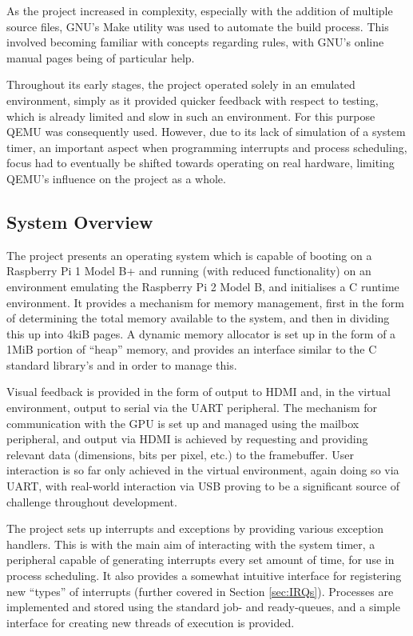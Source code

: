         As the project increased in complexity, especially with the addition of
        multiple source files, GNU's Make utility was used to automate the build
        process. This involved becoming familiar with concepts regarding rules,
        with GNU's online manual pages \cite{MakeManual, MakeVariables} being of
        particular help.

        Throughout its early stages, the project operated solely in an emulated
        environment, simply as it provided quicker feedback with respect to
        testing, which is already limited and slow in such an environment.
        For this purpose QEMU was consequently used. However, due to its lack of
        simulation of a system timer, an important aspect when programming
        interrupts and process scheduling, focus had to eventually be shifted
        towards operating on real hardware, limiting QEMU's influence on the
        project as a whole.
 
\subsection{System Overview}
    The project presents an operating system which is capable of booting on a
    Raspberry Pi 1 Model B+ and running (with reduced functionality) on an
    environment emulating the Raspberry Pi 2 Model B, and initialises a C
    runtime environment. It provides a mechanism for memory management, first in
    the form of determining the total memory available to the system, and then
    in dividing this up into 4kiB pages. A dynamic memory allocator is set up in
    the form of a 1MiB portion of ``heap'' memory, and provides an interface
    similar to the C standard library's  and  in
    order to manage this.

    Visual feedback is provided in the form of output to HDMI and, in the
    virtual environment, output to serial via the UART peripheral.  The
    mechanism for communication with the GPU is set up and managed using the
    mailbox peripheral, and output via HDMI is achieved by requesting and
    providing relevant data (dimensions, bits per pixel, etc.) to the
    framebuffer. User interaction is so far only achieved in the virtual
    environment, again doing so via UART, with real-world interaction via USB
    proving to be a significant source of challenge throughout development.

    The project sets up interrupts and exceptions by providing various exception
    handlers. This is with the main aim of interacting with the system timer, a
    peripheral capable of generating interrupts every set amount of time, for
    use in process scheduling. It also provides a somewhat intuitive interface
    for registering new ``types'' of interrupts (further covered in Section
    \ref{sec:IRQs}). Processes are implemented and stored using the standard
    job- and ready-queues, and a simple interface for creating new threads of
    execution is provided.

